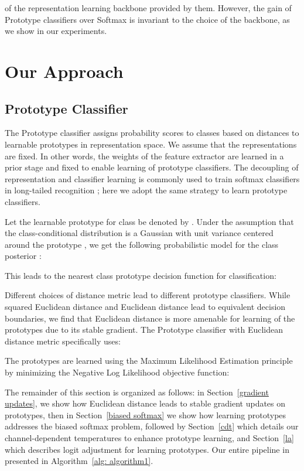 \documentclass{article}
\begin{document}
of the representation learning backbone provided by them. However, the gain of Prototype classifiers over Softmax is invariant to the choice of the backbone, as we show in our experiments. 

\section{Our Approach}
\label{Section4}

\subsection{Prototype Classifier} 

The Prototype classifier assigns probability scores to classes based on distances to learnable prototypes in representation space. We assume that the representations  are fixed. In other words, the weights  of the feature extractor  are learned in a prior stage and fixed to enable learning of prototype classifiers. The decoupling of representation and classifier learning is commonly used to train softmax classifiers in long-tailed recognition \cite{kang2019decoupling}; here we adopt the same strategy to learn prototype classifiers. 

Let the learnable prototype for class  be denoted by . Under the assumption that the class-conditional distribution  is a Gaussian with unit variance centered around the prototype , we get the following probabilistic model for the class posterior :  
  

This leads to the nearest class prototype decision function for classification:

Different choices of distance metric lead to different prototype classifiers. While squared Euclidean distance and Euclidean distance lead to equivalent decision boundaries, we find that Euclidean distance is more amenable for learning of the prototypes due to its stable gradient. The Prototype classifier with Euclidean distance metric specifically uses:

The prototypes are learned using the Maximum Likelihood Estimation principle by minimizing the Negative Log Likelihood objective function:

The remainder of this section is organized as follows: in Section~\ref{gradient updates}, we show how Euclidean distance leads to stable gradient updates on prototypes, then in Section~\ref{biased softmax} we show how learning prototypes addresses the biased softmax problem, followed by Section~\ref{cdt} which details our channel-dependent temperatures to enhance prototype learning, and Section~\ref{la} which describes logit adjustment for learning prototypes. Our entire pipeline in presented in Algorithm~\ref{alg: algorithm1}.
\end{document}
